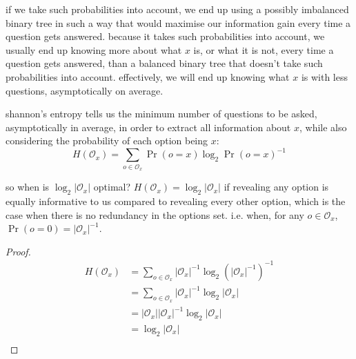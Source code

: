 \documentclass[twocolumn]{article}
\begin{document}
if we take such probabilities into account, we end up using a possibly
imbalanced binary tree in such a way that would maximise our information
gain every time a question gets answered.  because it takes such
probabilities into account, we usually end up knowing more about what $x$
is, or what it is not, every time a question gets answered, than a balanced
binary tree that doesn't take such probabilities into account.
effectively, we will end up knowing what $x$ is with less questions,
asymptotically on average.

shannon's entropy tells us the minimum number of questions to be asked,
asymptotically in average, in order to extract all information about $x$,
while also considering the probability of each option being $x$:
\begin{equation}
    H(\mathcal{O}_x) = \sum_{o \in \mathcal{O}_x}
        \Pr(o=x) \log_2 \Pr(o=x)^{-1}
\end{equation}

so when is $\log_2 |\mathcal{O}_x|$ optimal?  $H(\mathcal{O}_x) = \log_2
|\mathcal{O}_x|$ if revealing any option is equally informative to us
compared to revealing every other option, which is the case when there is
no redundancy in the options set.  i.e. when,  for any $o \in
\mathcal{O}_x$, $\Pr(o=0) = |\mathcal{O}_x|^{-1}$.
\begin{proof}
\begin{equation}
\begin{split}
    H(\mathcal{O}_x)
    &= \sum_{o \in \mathcal{O}_x} |\mathcal{O}_x|^{-1} \log_2
        (|\mathcal{O}_x|^{-1})^{-1} \\
    &= \sum_{o \in \mathcal{O}_x} |\mathcal{O}_x|^{-1} \log_2
        |\mathcal{O}_x| \\
    &= |\mathcal{O}_x| |\mathcal{O}_x|^{-1} \log_2 |\mathcal{O}_x| \\
    &= \log_2 |\mathcal{O}_x| \\
\end{split}
\end{equation}
\end{proof}
\end{document}

